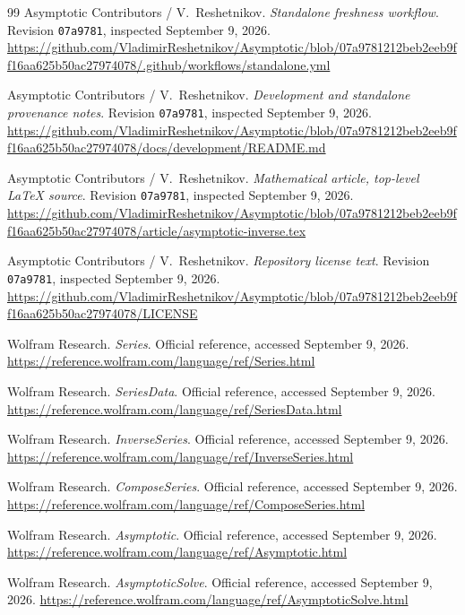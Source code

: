 \begin{thebibliography}{99}
 Asymptotic Contributors / V.~Reshetnikov. \emph{Standalone freshness workflow}. Revision \texttt{07a9781}, inspected September 9, 2026. \url{https://github.com/VladimirReshetnikov/Asymptotic/blob/07a9781212beb2eeb9ff16aa625b50ac27974078/.github/workflows/standalone.yml}

 Asymptotic Contributors / V.~Reshetnikov. \emph{Development and standalone provenance notes}. Revision \texttt{07a9781}, inspected September 9, 2026. \url{https://github.com/VladimirReshetnikov/Asymptotic/blob/07a9781212beb2eeb9ff16aa625b50ac27974078/docs/development/README.md}

 Asymptotic Contributors / V.~Reshetnikov. \emph{Mathematical article, top-level LaTeX source}. Revision \texttt{07a9781}, inspected September 9, 2026. \url{https://github.com/VladimirReshetnikov/Asymptotic/blob/07a9781212beb2eeb9ff16aa625b50ac27974078/article/asymptotic-inverse.tex}

 Asymptotic Contributors / V.~Reshetnikov. \emph{Repository license text}. Revision \texttt{07a9781}, inspected September 9, 2026. \url{https://github.com/VladimirReshetnikov/Asymptotic/blob/07a9781212beb2eeb9ff16aa625b50ac27974078/LICENSE}

 Wolfram Research. \emph{Series}. Official reference, accessed September 9, 2026. \url{https://reference.wolfram.com/language/ref/Series.html}

 Wolfram Research. \emph{SeriesData}. Official reference, accessed September 9, 2026. \url{https://reference.wolfram.com/language/ref/SeriesData.html}

 Wolfram Research. \emph{InverseSeries}. Official reference, accessed September 9, 2026. \url{https://reference.wolfram.com/language/ref/InverseSeries.html}

 Wolfram Research. \emph{ComposeSeries}. Official reference, accessed September 9, 2026. \url{https://reference.wolfram.com/language/ref/ComposeSeries.html}

 Wolfram Research. \emph{Asymptotic}. Official reference, accessed September 9, 2026. \url{https://reference.wolfram.com/language/ref/Asymptotic.html}

 Wolfram Research. \emph{AsymptoticSolve}. Official reference, accessed September 9, 2026. \url{https://reference.wolfram.com/language/ref/AsymptoticSolve.html}


\end{thebibliography}
